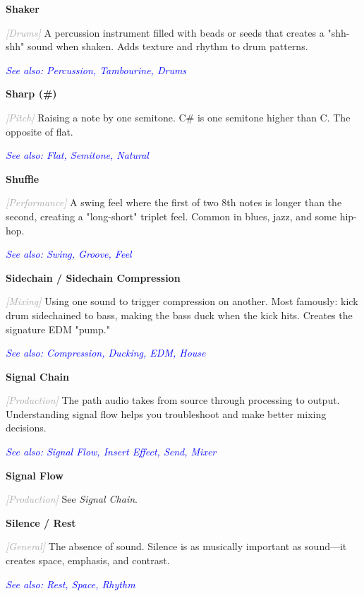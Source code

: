 \documentclass[11pt,letterpaper]{article}
\newcommand{\term}[1]{\textbf{\large\color{purple}#1}}
\newcommand{\category}[1]{\textcolor{darkgray}{\textit{\small [#1]}}}
\newcommand{\seealso}[1]{\textcolor{blue}{\textit{See also: #1}}}
\newenvironment{termdef}[1]
  {\noindent\term{#1}\par\nopagebreak}
  {\par\vspace{0.3em}}
\begin{document}
\begin{termdef}{Shaker}
\category{Drums}
A percussion instrument filled with beads or seeds that creates a "shh-shh" sound when shaken. Adds texture and rhythm to drum patterns.

\seealso{Percussion, Tambourine, Drums}
\end{termdef}

\begin{termdef}{Sharp (\#)}
\category{Pitch}
Raising a note by one semitone. C\# is one semitone higher than C. The opposite of flat.

\seealso{Flat, Semitone, Natural}
\end{termdef}

\begin{termdef}{Shuffle}
\category{Performance}
A swing feel where the first of two 8th notes is longer than the second, creating a "long-short" triplet feel. Common in blues, jazz, and some hip-hop.

\seealso{Swing, Groove, Feel}
\end{termdef}

\begin{termdef}{Sidechain / Sidechain Compression}
\category{Mixing}
Using one sound to trigger compression on another. Most famously: kick drum sidechained to bass, making the bass duck when the kick hits. Creates the signature EDM "pump."

\seealso{Compression, Ducking, EDM, House}
\end{termdef}

\begin{termdef}{Signal Chain}
\category{Production}
The path audio takes from source through processing to output. Understanding signal flow helps you troubleshoot and make better mixing decisions.

\seealso{Signal Flow, Insert Effect, Send, Mixer}
\end{termdef}

\begin{termdef}{Signal Flow}
\category{Production}
See \textit{Signal Chain}.
\end{termdef}

\begin{termdef}{Silence / Rest}
\category{General}
The absence of sound. Silence is as musically important as sound—it creates space, emphasis, and contrast.

\seealso{Rest, Space, Rhythm}
\end{termdef}
\end{document}
